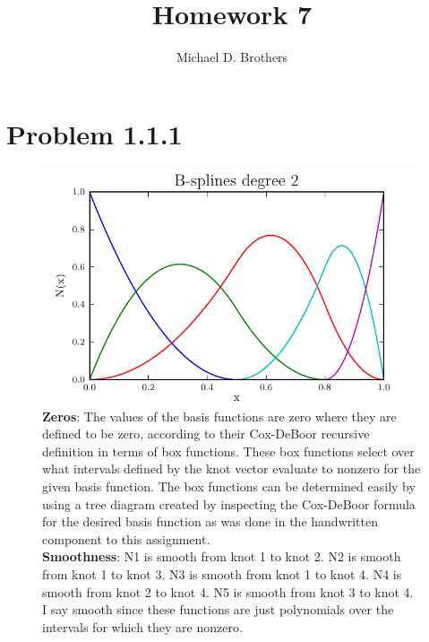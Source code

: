 \documentclass[11pt,letterpaper]{article}
\author{Michael D. Brothers}
\title{Homework 7}
\begin{document}
\section{Problem 1.1.1}

\begin{figure}[!tbh]
    \includegraphics[width=\textwidth]{problem_1_1_1.pdf}
    \caption{\textbf{Zeros}: 
    The values of the basis functions are zero where they are defined to be zero, according to their Cox-DeBoor recursive definition in terms of box functions. 
    These box functions select over what intervals defined by the knot vector evaluate to nonzero for the given basis function. 
    The box functions can be determined easily by using a tree diagram created by inspecting the Cox-DeBoor formula for the desired basis function as was done in the handwritten component to this assignment.\\
    \textbf{Smoothness}:
    N1 is smooth from knot 1 to knot 2. N2 is smooth from knot 1 to knot 3. N3 is smooth from knot 1 to knot 4. N4 is smooth from knot 2 to knot 4. N5 is smooth from knot 3 to knot 4. 
    I say smooth since these functions are just polynomials over the intervals for which they are nonzero.}
    \label{fig1:label:a}

\end{figure}
\end{document}
